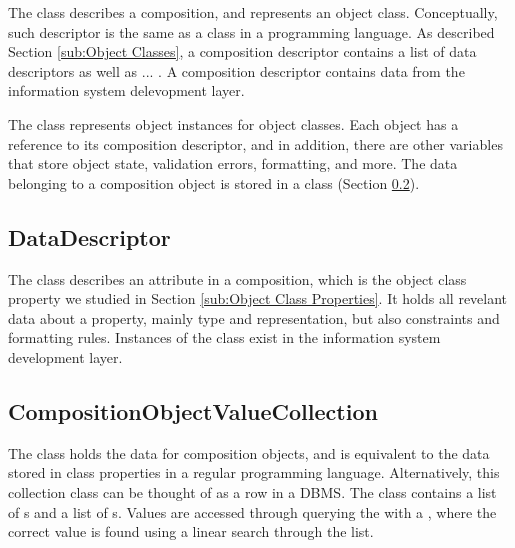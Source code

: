 The  class describes a composition, and represents an object class. Conceptually, such descriptor is the same as a class in a programming language. As described Section \ref{sub:Object Classes}, a composition descriptor contains a list of data descriptors as well as ... . A composition descriptor contains data from the information system delevopment layer.

The  class represents object instances for object classes. Each object has a reference to its composition descriptor, and in addition, there are other variables that store object state, validation errors, formatting, and more. The data belonging to a composition object is stored in a  class (Section \ref{sub:CompositionObjectValueCollection}).


\subsection{DataDescriptor}
\label{sub:DataDescriptor}
The  class describes an attribute in a composition, which is the object class property we studied in Section \ref{sub:Object Class Properties}. It holds all revelant data about a property, mainly type and representation, but also constraints and formatting rules. Instances of the  class exist in the information system development layer.

\subsection{CompositionObjectValueCollection}
\label{sub:CompositionObjectValueCollection}
The  class holds the data for composition objects, and is equivalent to the data stored in class properties in a regular programming language. Alternatively, this collection class can be thought of as a row in a DBMS. The class contains a list of s and a list of s. Values are accessed through querying the  with a , where the correct value is found using a linear search through the list.


